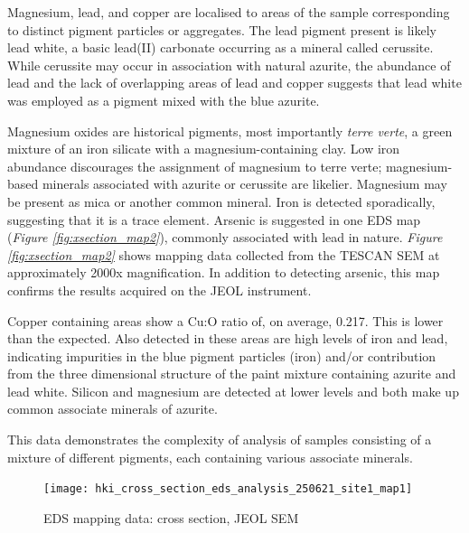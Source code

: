 Magnesium, lead, and copper are localised to areas of the sample corresponding to distinct pigment particles or aggregates. The lead pigment present is likely lead white, a basic lead(II) carbonate occurring as a mineral called cerussite. While cerussite may occur in association with natural azurite, the abundance of lead and the lack of overlapping areas of lead and copper suggests that lead white was employed as a pigment mixed with the blue azurite.~\autocite{Aru}

Magnesium oxides are historical pigments, most importantly \textit{terre verte}, a green mixture of an iron silicate with a magnesium-containing clay. Low iron abundance discourages the assignment of magnesium to terre verte; magnesium-based minerals associated with azurite or cerussite are likelier. Magnesium may be present as mica or another common mineral. Iron is detected sporadically, suggesting that it is a trace element. Arsenic is suggested in one EDS map (\textit{Figure \ref{fig:xsection_map2}}), commonly associated with lead in nature. \textit{Figure \ref{fig:xsection_map2}} shows mapping data collected from the TESCAN SEM at approximately 2000x magnification. In addition to detecting arsenic, this map confirms the results acquired on the JEOL instrument.

Copper containing areas show a Cu:O ratio of, on average, 0.217. This is lower than the expected. Also detected in these areas are high levels of iron and lead, indicating impurities in the blue pigment particles (iron) and/or contribution from the three dimensional structure of the paint mixture containing azurite and lead white. Silicon and magnesium are detected at lower levels and both make up common associate minerals of azurite.

This data demonstrates the complexity of analysis of samples consisting of a mixture of different pigments, each containing various associate minerals.



\begin{figure}[H]
\centering
  \texttt{[image: hki\_cross\_section\_eds\_analysis\_250621\_site1\_map1]}
\caption[EDS mapping data: cross section, JEOL SEM]{EDS mapping data: cross section, JEOL SEM}
\label{fig:xsection_map1}
\end{figure}

